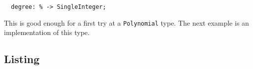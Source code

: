 \begin{small}
\begin{verbatim}
  degree: % -> SingleInteger;
\end{verbatim}
\end{small}

This is good enough for a first try at a \verb"Polynomial" type. The next example
is an implementation of this type. 
%

\subsection{Listing}
\label{PolynomialListing}

